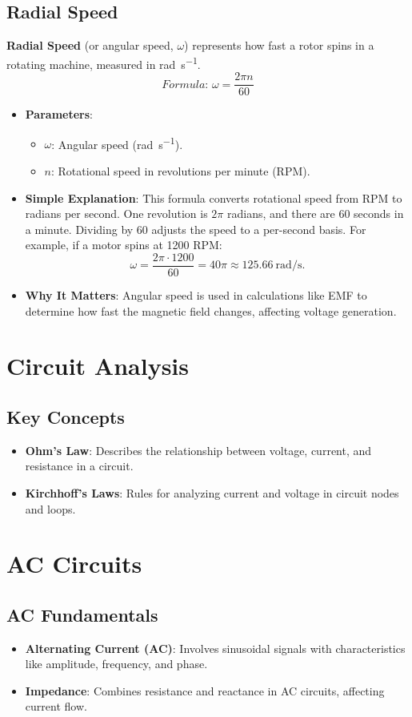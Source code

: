 \documentclass[12pt]{article}
\newcommand{\concept}[1]{\textbf{#1}}
\newcommand{\formula}[1]{\textit{Formula: }#1}
\begin{document}
\subsection{Radial Speed}
\concept{Radial Speed} (or angular speed, \(\omega\)) represents how fast a rotor spins in a rotating machine, measured in \si{\radian\per\second}.
\[
\formula{\omega = \frac{2 \pi n}{60}}
\]
\begin{itemize}
    \item \textbf{Parameters}:
        \begin{itemize}
            \item \(\omega\): Angular speed (\si{\radian\per\second}).
            \item \(n\): Rotational speed in revolutions per minute (RPM).
        \end{itemize}
    \item \textbf{Simple Explanation}: This formula converts rotational speed from RPM to radians per second. One revolution is \(2\pi\) radians, and there are 60 seconds in a minute. Dividing by 60 adjusts the speed to a per-second basis. For example, if a motor spins at 1200 RPM:
        \[
        \omega = \frac{2 \pi \cdot 1200}{60} = 40\pi \approx \SI{125.66}{\radian\per\second}.
        \]
    \item \textbf{Why It Matters}: Angular speed is used in calculations like EMF to determine how fast the magnetic field changes, affecting voltage generation.
\end{itemize}

\section{Circuit Analysis}
\subsection{Key Concepts}
\begin{itemize}
    \item \concept{Ohm's Law}: Describes the relationship between voltage, current, and resistance in a circuit.
    \item \concept{Kirchhoff's Laws}: Rules for analyzing current and voltage in circuit nodes and loops.
\end{itemize}

\section{AC Circuits}
\subsection{AC Fundamentals}
\begin{itemize}
    \item \concept{Alternating Current (AC)}: Involves sinusoidal signals with characteristics like amplitude, frequency, and phase.
    \item \concept{Impedance}: Combines resistance and reactance in AC circuits, affecting current flow.
\end{itemize}
\end{document}
